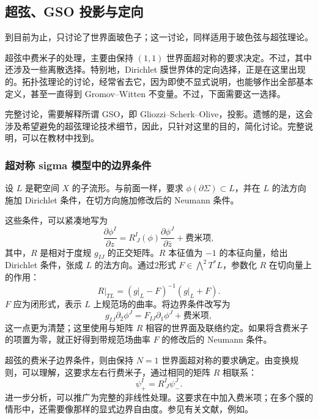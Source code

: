 \subsection{超弦、GSO 投影与定向}\label{sec:3.5.3}

到目前为止，只讨论了世界面玻色子；这一讨论，同样适用于玻色弦与超弦理论。

超弦中费米子的处理，主要由保持 $(1,1)$ 世界面超对称的要求决定。不过，其中还涉及一些离散选择。特别地，Dirichlet 膜世界体的定向选择，正是在这里出现的。拓扑弦理论的讨论，经常省去它，因为即使不显式说明，也能够作出全部基本定义，甚至一直得到 Gromov--Witten 不变量。不过，下面需要这一选择。

完整讨论，需要解释所谓 GSO，即 Gliozzi--Scherk--Olive，投影。遗憾的是，这会涉及希望避免的超弦理论技术细节，因此，只针对这里的目的，简化讨论。完整说明，可以在教材中找到。

\subsubsection{超对称 sigma 模型中的边界条件}\label{sec:3.5.3.1}

设 $L$ 是靶空间 $X$ 的子流形。与前面一样，要求 $\phi(\partial\Sigma)\subset L$，并在 $L$ 的法方向施加 Dirichlet 条件，在切方向施加修改后的 Neumann 条件。

这些条件，可以紧凑地写为
\begin{equation}\label{eq:3.154}
\frac{\partial\phi^I}{\partial z}
=R^I_{\ J}(\phi)\frac{\partial\phi^J}{\partial\bar z}
+\text{费米项},
\end{equation}
其中，$R$ 是相对于度规 $g_{IJ}$ 的正交矩阵。$R$ 本征值为 $-1$ 的本征向量，给出 Dirichlet 条件，张成 $L$ 的法方向。通过2形式 $F\in\bigwedge^2T^*L$，参数化 $R$ 在切向量上的作用：
\[
R|_{TL}=(g|_L-F)^{-1}(g|_L+F).
\]
$F$ 应为闭形式，表示 $L$ 上规范场的曲率。将边界条件改写为
\begin{equation}\label{eq:3.155}
g_{IJ}\partial_2\phi^J
=F_{IJ}\partial_1\phi^J+\text{费米项},
\end{equation}
这一点更为清楚；这里使用与矩阵 $R$ 相容的世界面及联络约定。如果将含费米子的项置为零，就正好得到带规范场曲率 $F$ 的修改后的 Neumann 条件。

超弦的费米子边界条件，则由保持 $N=1$ 世界面超对称的要求确定。由变换规则，可以理解，这要求左右行费米子，通过相同的矩阵 $R$ 相联系：
\begin{equation}\label{eq:3.156}
\psi_+^I=R^I_{\ J}\psi_-^J.
\end{equation}
进一步分析，可以推广为完整的非线性处理。这要求在中加入费米项；在多个膜的情形中，还需要像那样的显式边界自由度。参见有关文献，例如。

